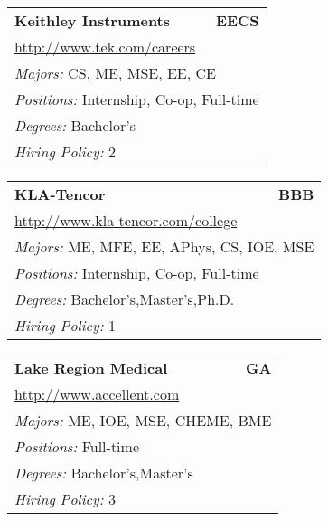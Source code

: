 \documentclass[twoside]{article}
\begin{document}
\begin{center}
\begin{multicols}{3}
\begin{FlushLeft}
\begin{minipage}{.9\columnwidth}
\end{minipage}
 
\begin{minipage}{.9\columnwidth}\begin{tabularx}{.95\columnwidth}{Xr}
                 {\Large\bf Keithley Instruments} & {\Large\bf EECS}\\
    \multicolumn{2}{p{.95\columnwidth}}{\url{http://www.tek.com/careers}}\\
    \multicolumn{2}{p{.95\columnwidth}}{\emph{Majors:} CS, ME, MSE, EE, CE}\\
    \multicolumn{2}{p{.95\columnwidth}}{\emph{Positions:} Internship, Co-op, Full-time}\\
    \multicolumn{2}{p{.95\columnwidth}}{\emph{Degrees:} Bachelor's}\\
    \multicolumn{2}{p{.95\columnwidth}}{\emph{Hiring Policy:} 2}\\
    \end{tabularx}
    
\end{minipage}
 
\begin{minipage}{.9\columnwidth}\begin{tabularx}{.95\columnwidth}{Xr}
                 {\Large\bf KLA-Tencor} & {\Large\bf BBB}\\
    \multicolumn{2}{p{.95\columnwidth}}{\url{http://www.kla-tencor.com/college}}\\
    \multicolumn{2}{p{.95\columnwidth}}{\emph{Majors:} ME, MFE, EE, APhys, CS, IOE, MSE}\\
    \multicolumn{2}{p{.95\columnwidth}}{\emph{Positions:} Internship, Co-op, Full-time}\\
    \multicolumn{2}{p{.95\columnwidth}}{\emph{Degrees:} Bachelor's,Master's,Ph.D.}\\
    \multicolumn{2}{p{.95\columnwidth}}{\emph{Hiring Policy:} 1}\\
    \end{tabularx}
    
\end{minipage}
 
\begin{minipage}{.9\columnwidth}\begin{tabularx}{.95\columnwidth}{Xr}
                 {\Large\bf Lake Region Medical} & {\Large\bf GA}\\
    \multicolumn{2}{p{.95\columnwidth}}{\url{http://www.accellent.com}}\\
    \multicolumn{2}{p{.95\columnwidth}}{\emph{Majors:} ME, IOE, MSE, CHEME, BME}\\
    \multicolumn{2}{p{.95\columnwidth}}{\emph{Positions:} Full-time}\\
    \multicolumn{2}{p{.95\columnwidth}}{\emph{Degrees:} Bachelor's,Master's}\\
    \multicolumn{2}{p{.95\columnwidth}}{\emph{Hiring Policy:} 3}\\
    \end{tabularx}
    

\end{minipage}
\end{FlushLeft}
\end{multicols}
\end{center}
\end{document}
